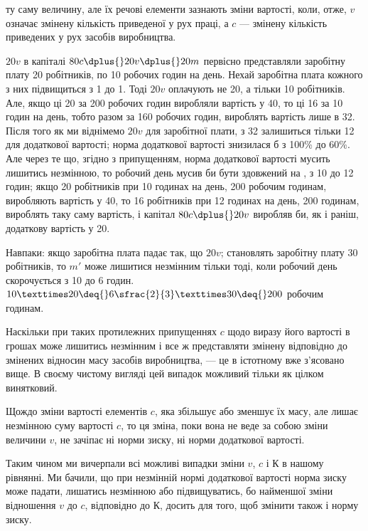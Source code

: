 \parcont{}  %
ту саму величину, але їх речові елементи зазнають зміни вартості,
коли, отже, $v$ означає змінену кількість приведеної у рух
праці, а $c$ — змінену кількість приведених у рух засобів виробництва.

$20v$ в капіталі $80c \dplus{} 20v \dplus{} 20m$ первісно представляли заробітну
плату 20 робітників, по 10 робочих годин на день. Нехай
заробітна плата кожного з них підвищиться з 1 до 1. Тоді $20v$
оплачують не 20, а тільки 10 робітників. Але, якщо ці 20 за
200 робочих годин виробляли вартість у 40, то ці 16 за 10 годин
на день, тобто разом за 160 робочих годин, вироблять вартість
лише в 32. Після того як ми віднімемо $20v$ для заробітної
плати, з 32 залишиться тільки 12 для додаткової вартості; норма
додаткової вартості знизилася б з 100\% до 60\%. Але через
те що, згідно з припущенням, норма додаткової вартості мусить
лишитись незмінною, то робочий день мусив би бути здовжений
на , з 10 до 12 годин; якщо 20 робітників при 10 годинах
на день, \deq{} 200 робочим годинам, виробляють вартість у 40, то
16 робітників при 12 годинах на день, \deq{} 200 годинам, вироблять
таку саму вартість, і капітал $80c \dplus{} 20v$ виробляв би, як і раніш,
додаткову вартість у 20.

Навпаки: якщо заробітна плата падає так, що $20v$; становлять
заробітну плату 30 робітників, то $m'$ може лишитися
незмінним тільки тоді, коли робочий день скорочується з 10
до 6 годин. $10 × 20 \deq{} 6\sfrac{2}{3} × 30 \deq{} 200$ робочим годинам.

Наскільки при таких протилежних припущеннях $c$ щодо виразу
його вартості в грошах може лишитись незмінним і все ж
представляти змінену відповідно до змінених відносин масу
засобів виробництва, — це в істотному вже з’ясовано вище.
В своєму чистому вигляді цей випадок можливий тільки як цілком
винятковий.

Щождо зміни вартості елементів $c$, яка збільшує або зменшує
їх масу, але лишає незмінною суму вартості $c$, то ця зміна, поки
вона не веде за собою зміни величини $v$, не зачіпає ні норми
зиску, ні норми додаткової вартості.

Таким чином ми вичерпали всі можливі випадки зміни $v$, $c$
і $К$ в нашому рівнянні. Ми бачили, що при незмінній нормі додаткової
вартості норма зиску може падати, лишатись незмінною
або підвищуватись, бо найменшої зміни відношення $v$ до $c$,
відповідно до $К$, досить для того, щоб змінити також і норму
зиску.

